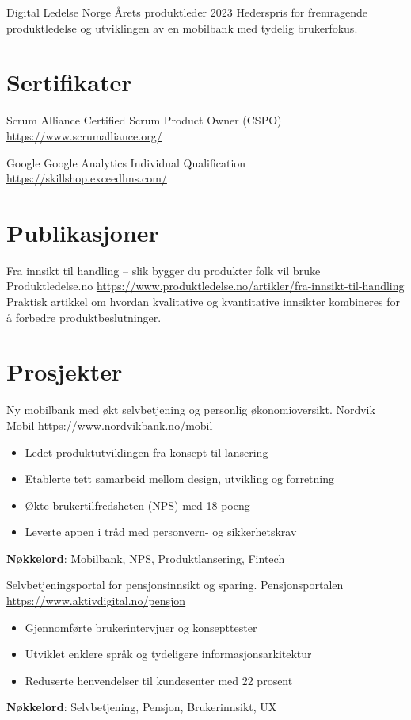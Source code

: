 \documentclass[a4paper, serif, 10pt]{moderncv}
\begin{document}
        {Digital Ledelse Norge}
        {Årets produktleder 2023}
        {}
        {}
        {Hederspris for fremragende produktledelse og utviklingen av en mobilbank med tydelig brukerfokus.}
\section{Sertifikater}

        {Scrum Alliance}
        {Certified Scrum Product Owner (CSPO)}
        {\url{https://www.scrumalliance.org/}}
        {}
        {}

        {Google}
        {Google Analytics Individual Qualification}
        {\url{https://skillshop.exceedlms.com/}}
        {}
        {}
\section{Publikasjoner}

        {Fra innsikt til handling – slik bygger du produkter folk vil bruke}
        {Produktledelse.no}
        {\url{https://www.produktledelse.no/artikler/fra-innsikt-til-handling}}
        {}
        {Praktisk artikkel om hvordan kvalitative og kvantitative innsikter kombineres for å forbedre produktbeslutninger.}
\section{Prosjekter}

        {Ny mobilbank med økt selvbetjening og personlig økonomioversikt.}
        {Nordvik Mobil}
        {\url{https://www.nordvikbank.no/mobil}}
        {}
        {\begin{itemize}
\item Ledet produktutviklingen fra konsept til lansering
\item Etablerte tett samarbeid mellom design, utvikling og forretning
\item Økte brukertilfredsheten (NPS) med 18 poeng
\item Leverte appen i tråd med personvern- og sikkerhetskrav
\end{itemize}
\textbf{Nøkkelord}: Mobilbank, NPS, Produktlansering, Fintech}

        {Selvbetjeningsportal for pensjonsinnsikt og sparing.}
        {Pensjonsportalen}
        {\url{https://www.aktivdigital.no/pensjon}}
        {}
        {\begin{itemize}
\item Gjennomførte brukerintervjuer og konsepttester
\item Utviklet enklere språk og tydeligere informasjonsarkitektur
\item Reduserte henvendelser til kundesenter med 22 prosent
\end{itemize}
\textbf{Nøkkelord}: Selvbetjening, Pensjon, Brukerinnsikt, UX}
\end{document}
